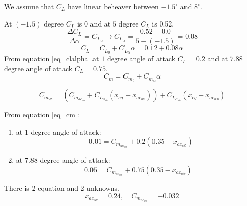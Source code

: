 We assume that $C_L$ have linear beheaver between $-1.5^{\circ}$ and $8^{\circ}$.


At $(-1.5)$ degree $C_L$ is $0$ and at $5$ degree $C_L$ is 0.52.
$$\dfrac{\Delta C_L}{\Delta \alpha} = C_{L_{\alpha}}\to C_{L_{\alpha}} = \dfrac{0.52 - 0.0}{5 - (-1.5)} = 0.08$$
\begin{equation}
C_L = C_{L_0}+C_{L_\alpha}\alpha = 0.12 + 0.08\alpha
\label{eq_clalpha}
\end{equation}
From equation \ref{eq_clalpha} at $1$ degree angle of attack $C_L = 0.2$ and at $7.88$ degree angle of attack $C_L = 0.75$.
\begin{equation}
C_m = C_{m_0} + C_{m_\alpha}\alpha
\label{eq_cm}
\end{equation}


\begin{equation}
C_{m_{wb}} = (C_{m_{ac_{wb}}} + C_{L_{0_{wb}}}(\bar x_{cg} - \bar x_{ac_{wb}})) +
C_{L_{\alpha_{wb}}}(\bar x_{cg} - \bar x_{ac_{wb}})
\label{eq_cm}
\end{equation}


From equation \ref{eq_cm}:
\begin{enumerate}
    \item at $1$ degree angle of attack:
    $$-0.01 = C_{m_{ac_{wb}}}  + 0.2 (0.35-\bar x_{ac_{wb}}) $$
    \item at $7.88$ degree angle of attack:
    $$0.05 =C_{m_{ac_{wb}}} +  0.75(0.35-\bar x_{ac_{wb}}) $$
\end{enumerate}
There is 2 equation and 2 unknowns.
$$x_{ac_{wb}} = 0.24,\quad C_{m_{ac_{wb}}} = -0.032$$


